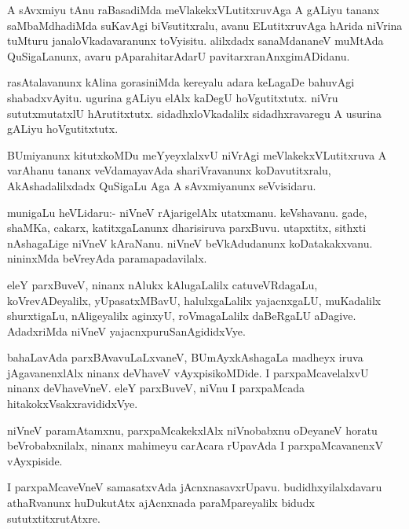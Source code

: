 \documentclass{article}
\begin{document}
\begin{mn}
A sAvxmiyu tAnu raBasadiMda meVlakekxVLutitxruvAga A gALiyu tananx
saMbaMdhadiMda suKavAgi biVsutitxralu, avanu ELutitxruvAga hArida
niVrina tuMturu janaloVkadavaranunx toVyisitu. alilxdadx sanaMdananeV
muMtAda QuSigaLanunx, avaru pAparahitarAdarU pavitarxranAnxgimADidanu.
\end{mn}

\begin{mn}
rasAtalavanunx kAlina gorasiniMda kereyalu adara keLagaDe bahuvAgi
shabadxvAyitu. ugurina gALiyu elAlx kaDegU hoVgutitxtutx. niVru
sututxmutatxlU hArutitxtutx. sidadhxloVkadalilx sidadhxravaregu A
usurina gALiyu hoVgutitxtutx.
\end{mn}

\begin{mn}%
BUmiyanunx kitutxkoMDu meYyeyxlalxvU niVrAgi meVlakekxVLutitxruva A
varAhanu tananx veVdamayavAda shariVravanunx koDavutitxralu,
AkAshadalilxdadx QuSigaLu Aga A sAvxmiyanunx seVvisidaru.
\end{mn}

\begin{mn}
munigaLu heVLidaru:- niVneV rAjarigelAlx utatxmanu. keVshavanu. gade,
shaMKa, cakarx, katitxgaLanunx dharisiruva parxBuvu. utapxtitx,
sithxti nAshagaLige niVneV kAraNanu. niVneV beVkAdudanunx
koDatakakxvanu. nininxMda beVreyAda paramapadavilalx.
\end{mn}

\begin{mn}
eleY parxBuveV, ninanx nAlukx kAlugaLalilx catuveVRdagaLu,
koVrevADeyalilx, yUpasatxMBavU, halulxgaLalilx yajacnxgaLU, muKadalilx
shurxtigaLu, nAligeyalilx aginxyU, roVmagaLalilx daBeRgaLU
aDagive. AdadxriMda niVneV yajacnxpuruSanAgididxVye.
\end{mn}

\begin{mn}
bahaLavAda parxBAvavuLaLxvaneV, BUmAyxkAshagaLa madheyx iruva
jAgavanenxlAlx ninanx deVhaveV vAyxpisikoMDide. I parxpaMcavelalxvU
ninanx deVhaveVneV. eleY parxBuveV, niVnu I parxpaMcada hitakokxVsakxravididxVye.
\end{mn}

\begin{mn}
niVneV paramAtamxnu, parxpaMcakekxlAlx niVnobabxnu oDeyaneV horatu
beVrobabxnilalx, ninanx mahimeyu carAcara rUpavAda I parxpaMcavanenxV vAyxpiside.
\end{mn}

\begin{mn}
I parxpaMcaveVneV samasatxvAda jAcnxnasavxrUpavu. budidhxyilalxdavaru
athaRvanunx huDukutAtx ajAcnxnada paraMpareyalilx bidudx sututxtitxrutAtxre.
\end{mn}
\end{document}
